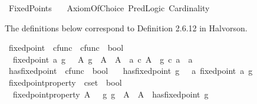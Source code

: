 %
\begin{isabellebody}%
%
%
\isadelimdocument
%
\endisadelimdocument
%
\isatagdocument
%
\isamarkuptrue%
%
\endisatagdocument
{\isafolddocument}%
%
\isadelimdocument
%
\endisadelimdocument
%
\isadelimtheory
%
\endisadelimtheory
%
\isatagtheory
{}\isamarkupfalse%
\ Fixed{\isacharunderscore}{\kern0pt}Points\isanewline
\ \ \ Axiom{\isacharunderscore}{\kern0pt}Of{\isacharunderscore}{\kern0pt}Choice\ Pred{\isacharunderscore}{\kern0pt}Logic\ Cardinality\isanewline
{}%
\endisatagtheory
{\isafoldtheory}%
%
\isadelimtheory
%
\endisadelimtheory
%
\begin{isamarkuptext}%
The definitions below correspond to Definition 2.6.12 in Halvorson.%
\end{isamarkuptext}\isamarkuptrue%
\isamarkupfalse%
\ fixed{\isacharunderscore}{\kern0pt}point\ {\isacharcolon}{\kern0pt}{\isacharcolon}{\kern0pt}\ {\isachardoublequoteopen}cfunc\ {\isasymRightarrow}\ cfunc\ {\isasymRightarrow}\ bool{\isachardoublequoteclose}\ \isanewline
\ \ {\isachardoublequoteopen}fixed{\isacharunderscore}{\kern0pt}point\ a\ g\ {\isasymlongleftrightarrow}\ {\isacharparenleft}{\kern0pt}{\isasymexists}\ A{\isachardot}{\kern0pt}\ g\ {\isacharcolon}{\kern0pt}\ A\ {\isasymrightarrow}\ A\ {\isasymand}\ a\ {\isasymin}\isactrlsub c\ A\ {\isasymand}\ g\ {\isasymcirc}\isactrlsub c\ a\ {\isacharequal}{\kern0pt}\ a{\isacharparenright}{\kern0pt}{\isachardoublequoteclose}\isanewline
{}\isamarkupfalse%
\ has{\isacharunderscore}{\kern0pt}fixed{\isacharunderscore}{\kern0pt}point\ {\isacharcolon}{\kern0pt}{\isacharcolon}{\kern0pt}\ {\isachardoublequoteopen}cfunc\ {\isasymRightarrow}\ bool{\isachardoublequoteclose}\ \isanewline
\ \ {\isachardoublequoteopen}has{\isacharunderscore}{\kern0pt}fixed{\isacharunderscore}{\kern0pt}point\ g\ {\isasymlongleftrightarrow}\ {\isacharparenleft}{\kern0pt}{\isasymexists}\ a{\isachardot}{\kern0pt}\ fixed{\isacharunderscore}{\kern0pt}point\ a\ g{\isacharparenright}{\kern0pt}{\isachardoublequoteclose}\isanewline
{}\isamarkupfalse%
\ fixed{\isacharunderscore}{\kern0pt}point{\isacharunderscore}{\kern0pt}property\ {\isacharcolon}{\kern0pt}{\isacharcolon}{\kern0pt}\ {\isachardoublequoteopen}cset\ {\isasymRightarrow}\ bool{\isachardoublequoteclose}\ \isanewline
\ \ {\isachardoublequoteopen}fixed{\isacharunderscore}{\kern0pt}point{\isacharunderscore}{\kern0pt}property\ A\ {\isasymlongleftrightarrow}\ {\isacharparenleft}{\kern0pt}{\isasymforall}\ g{\isachardot}{\kern0pt}\ g\ {\isacharcolon}{\kern0pt}\ A\ {\isasymrightarrow}\ A\ {\isasymlongrightarrow}\ has{\isacharunderscore}{\kern0pt}fixed{\isacharunderscore}{\kern0pt}point\ g{\isacharparenright}{\kern0pt}{\isachardoublequoteclose}\isanewline

\end{isabellebody}
